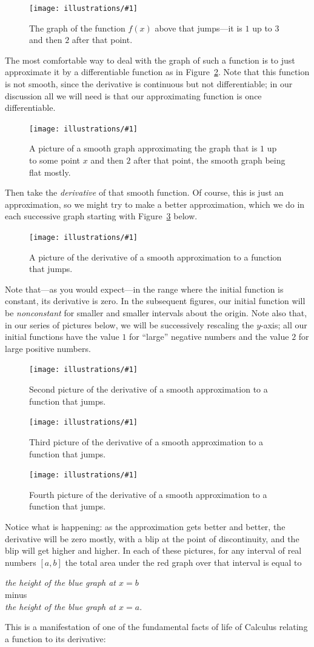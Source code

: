 \documentclass[openany]{book}
\newcommand{\ill}[3]{%
   \begin{figure}[H]%
   \vspace{-2ex}
   \centering%
   \texttt{[image: illustrations/\#1]}%
   \caption{#3}%
   \vspace{-2ex}
    \end{figure}}
\theoremstyle{plain}
\theoremstyle{definition}
\begin{document}
\ill{jump}{0.5}{The graph of the function $f(x)$ above that jumps---it is $1$ up to $3$ and then $2$ after that point.\label{fig:jump}}

  
The most comfortable way to deal with the graph of such a function is
to just approximate it by a differentiable function as in
Figure~\ref{fig:jumpsmooth}.  Note that this function is not smooth, since the
derivative is continuous but not differentiable; in our discussion all
we will need is that our approximating function is once
differentiable.

   
\ill{jump-smooth}{0.5}{A picture of a smooth graph approximating the
  graph that is $1$ up to some point $x$ and then $2$ after that
  point, the smooth graph being flat mostly.\label{fig:jumpsmooth}}


Then take the {\em derivative} of that smooth function.  Of course,
this is just an approximation, so we might try to make a better
approximation, which we do in each successive graph starting
with Figure~\ref{fig:djump1} below.


\ill{jump-smooth-deriv-7}{0.6}{A picture of the derivative of
a smooth approximation to a function that jumps.\label{fig:djump1}}

Note that---as you would expect---in the range where the initial
function is constant, its derivative is zero. In the subsequent
figures, our initial function will be {\it nonconstant} for smaller
and smaller intervals about the origin. Note also that, in our series
of pictures below, we will be successively rescaling the $y$-axis; all
our initial functions have the value $1$ for ``large'' negative numbers
and the value $2$ for large positive numbers.

\ill{jump-smooth-deriv-2}{0.5}{Second picture of the derivative of
a smooth approximation to a function that jumps.\label{fig:djump2}}
\ill{jump-smooth-deriv-05}{0.5}{Third picture of the derivative of
a smooth approximation to a function that jumps.\label{fig:djump3}}
\ill{jump-smooth-deriv-01}{0.5}{Fourth picture of the derivative of
a smooth approximation to a function that jumps.\label{fig:djump4}}


Notice what is happening: as the approximation gets better and
better, the derivative will be zero mostly, with a blip at the point
of discontinuity, and the blip will get higher and higher. 
In each of these pictures,  for any interval of real numbers $[a,b]$ the total area under the red graph over that interval is equal to
\begin{center}
{\it the height of the blue graph at $x=b$}\\
minus\\
{\it  the height of the blue graph  at $x=a$}. 
\end{center}
This is a manifestation of one of the fundamental facts of life of
Calculus relating a function to its derivative:
  
\end{document}
